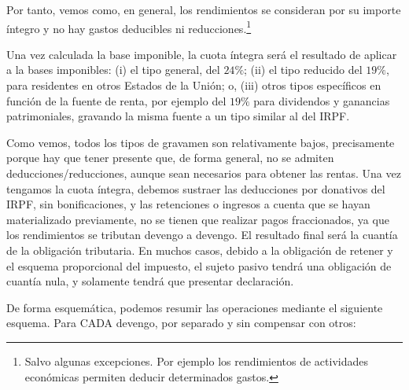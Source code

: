 \documentclass[10pt,a4paper]{article}
\begin{document}
Por tanto, vemos como, en general, los rendimientos se consideran por su importe íntegro y no hay gastos deducibles ni reducciones.\footnote{%
    Salvo algunas excepciones. Por ejemplo los rendimientos de actividades económicas permiten deducir determinados gastos.
}

Una vez calculada la base imponible, la cuota íntegra será el resultado de aplicar a la bases imponibles: (i) el tipo general, del $24\%$; (ii) el tipo reducido del $19\%$, para residentes en otros Estados de la Unión; o, (iii) otros tipos específicos en función de la fuente de renta, por ejemplo del $19\%$ para dividendos y ganancias patrimoniales, gravando la misma fuente a un tipo similar al del IRPF.

Como vemos, todos los tipos de gravamen son relativamente bajos, precisamente porque hay que tener presente que, de forma general, no se admiten deducciones/reducciones, aunque sean necesarios para obtener las rentas. Una vez tengamos la cuota íntegra, debemos sustraer las deducciones por donativos del IRPF, sin bonificaciones, y las retenciones o ingresos a cuenta que se hayan materializado previamente, no se tienen que realizar pagos fraccionados, ya que los rendimientos se tributan devengo a devengo. El resultado final será la cuantía de la obligación tributaria. En muchos casos, debido a la obligación de retener y el esquema proporcional del impuesto, el sujeto pasivo tendrá una obligación de cuantía nula, y solamente tendrá que presentar declaración.

De forma esquemática, podemos resumir las operaciones mediante el siguiente esquema. Para CADA devengo, por separado y sin compensar con otros:
\end{document}
